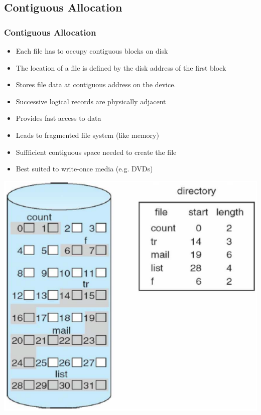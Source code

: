 \documentclass{beamer}
\begin{document}
\subsection{Contiguous Allocation}
\begin{frame}
\frametitle{Contiguous Allocation}
\begin{itemize}
\item Each file has to occupy contiguous blocks on disk
\item The location of a file is defined by the disk address of the first block
\item Stores file data at contiguous address on the device.
\item Successive logical records are physically adjacent
\item Provides fast access to data
\item Leads to fragmented file system (like memory)
\item Suffficient contiguous space needed to create the file
\item Best suited to write-once media (e.g. DVDs)
\end{itemize}
\includegraphics[scale=0.2]{contig.png}
\end{frame}
\end{document}
